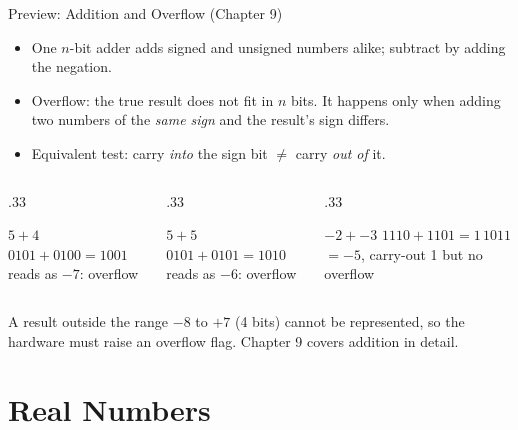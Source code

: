 \documentclass[9pt,aspectratio=169,xcolor=table]{beamer}
\begin{document}
\begin{frame}{Preview: Addition and Overflow (Chapter 9)}
  \begin{itemize}\small
    \item One $n$-bit adder adds signed and unsigned numbers alike; subtract by adding the negation.
    \item \alert{Overflow}: the true result does not fit in $n$ bits. It happens only when adding two numbers of the \emph{same sign} and the result's sign differs.
    \item Equivalent test: carry \emph{into} the sign bit $\ne$ carry \emph{out of} it.
  \end{itemize}
  \begin{columns}[t]
  \begin{column}{.33\textwidth}
    \begin{block}{$5 + 4$}
      \small $0101 + 0100 = 1001$\\
      reads as $-7$: \alert{overflow}
    \end{block}
  \end{column}
  \begin{column}{.33\textwidth}
    \begin{block}{$5 + 5$}
      \small $0101 + 0101 = 1010$\\
      reads as $-6$: \alert{overflow}
    \end{block}
  \end{column}
  \begin{column}{.33\textwidth}
    \begin{block}{$-2 + -3$}
      \small $1110 + 1101 = 1\,1011$\\
      $= -5$, carry-out 1 but \alert{no} overflow
    \end{block}
  \end{column}
  \end{columns}
  \vspace{2mm}
  {\small A result outside the range $-8$ to $+7$ (4 bits) cannot be represented, so the hardware must raise an \alert{overflow flag}. Chapter 9 covers addition in detail.}
\end{frame}

\section{Real Numbers}
\end{document}
